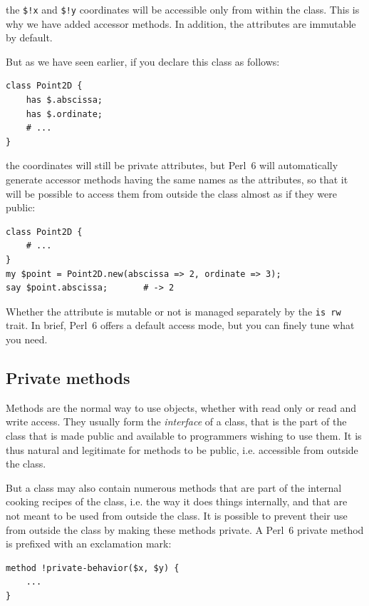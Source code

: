 the \verb'$!x' and \verb'$!y' coordinates will be 
accessible only from within the class. This is why 
we have added accessor methods. In addition, the 
attributes are immutable by default.

But as we have seen earlier, if you declare this class 
as follows:

\begin{verbatim}
class Point2D {
    has $.abscissa;
    has $.ordinate;
    # ...
}
\end{verbatim}

the coordinates will still be private attributes, but Perl~6 
will automatically generate accessor methods having the same 
names as the attributes, so that it will be possible to access 
them from outside the class almost as if they were public:

\begin{verbatim}
class Point2D {
    # ...
}
my $point = Point2D.new(abscissa => 2, ordinate => 3);
say $point.abscissa;       # -> 2
\end{verbatim}

Whether the attribute is mutable or not is managed separately 
by the {\tt is rw} trait. In brief, Perl~6 offers a default 
access mode, but you can finely tune what you need.


\subsection{Private methods}

Methods are the normal way to use objects, whether with read only 
or read and write access. They usually form the \emph{interface} 
of a class, that is the part of the class that is made public 
and available to programmers wishing to use them. It is thus 
natural and legitimate for methods to be public, i.e. accessible 
from outside the class.

But a class may also contain numerous methods that are part 
of the internal cooking recipes of the class, i.e. the way it does 
things internally, and that are not 
meant to be used from outside the class. It is possible to prevent 
their use from outside the class by making these methods private. 
A Perl~6 private method is prefixed with an exclamation mark:

\begin{verbatim}
method !private-behavior($x, $y) {
    ...
}
\end{verbatim}

